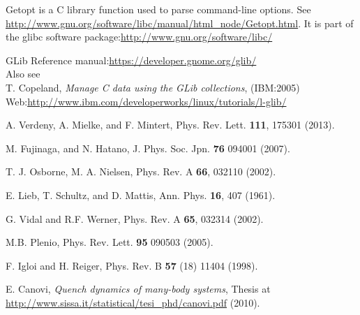 \documentclass[a4paper,10pt]{article}
\begin{document}
\begin{thebibliography}{10}
Getopt is a C library function used to parse command-line options. See \url{http://www.gnu.org/software/libc/manual/html_node/Getopt.html}. It is part of the glibc software package:\url{http://www.gnu.org/software/libc/}

\newblock GLib Reference manual:\url{https://developer.gnome.org/glib/}\\
Also see \\
\newblock T. Copeland, {\em Manage C data using the GLib collections}, (IBM:2005)
\newblock Web:\url{http://www.ibm.com/developerworks/linux/tutorials/l-glib/}

A. Verdeny, A. Mielke, and F. Mintert, Phys. Rev. Lett. {\bf 111}, 175301 (2013).

M. Fujinaga, and N. Hatano, J. Phys. Soc. Jpn. {\bf 76} 094001 (2007).

T. J. Osborne, M. A. Nielsen, Phys. Rev. A {\bf 66}, 032110 (2002).

E. Lieb, T. Schultz, and D. Mattis, Ann. Phys. {\bf 16}, 407 (1961).

G. Vidal and R.F. Werner, Phys. Rev. A {\bf 65}, 032314 (2002).

M.B. Plenio, Phys. Rev. Lett. {\bf 95} 090503 (2005).

F. Igloi and H. Reiger, Phys. Rev. B {\bf 57} (18) 11404 (1998).

E. Canovi, \textit{Quench dynamics of many-body systems}, Thesis at \url{http://www.sissa.it/statistical/tesi_phd/canovi.pdf} (2010).
\end{thebibliography}
\end{document}

